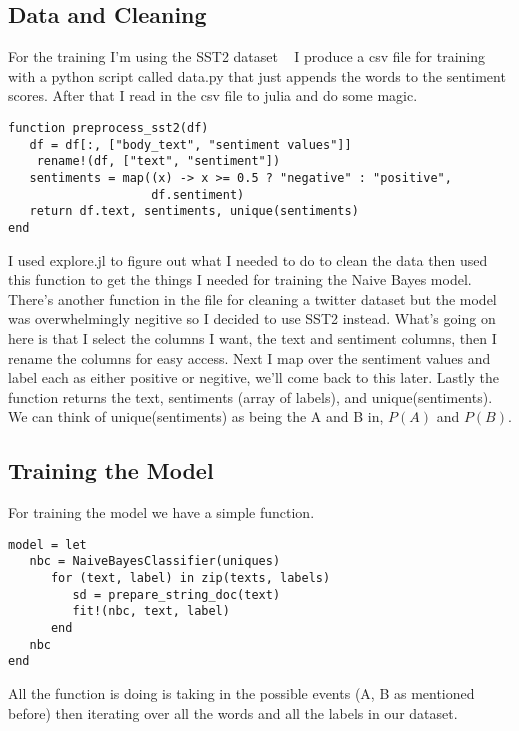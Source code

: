 \documentclass[12pt]{article}
\begin{document}
\subsection{Data and Cleaning}
For the training I'm using the SST2 dataset ~\cite{} %
I produce a csv file for training with a python script called data.py that just appends the words to the sentiment scores. After that I read in the csv file to julia and do some magic.
\begin{verbatim}
function preprocess_sst2(df)
   df = df[:, ["body_text", "sentiment values"]]
	rename!(df, ["text", "sentiment"])
   sentiments = map((x) -> x >= 0.5 ? "negative" : "positive",
                    df.sentiment)
   return df.text, sentiments, unique(sentiments)
end
\end{verbatim}
I used explore.jl to figure out what I needed to do to clean the data then used this function to get the things I needed for training the Naive Bayes model. There's another function in the file for cleaning a twitter dataset but the model was overwhelmingly negitive so I decided to use SST2 instead. What's going on here is that I select the columns I want, the text and sentiment columns, then I rename the columns for easy access. Next I map over the sentiment values and label each as either positive or negitive, we'll come back to this later. Lastly the function returns the text, sentiments (array of labels), and unique(sentiments). We can think of unique(sentiments) as being the A and B in, $P(A)$ and $P(B)$.

\subsection{Training the Model}
For training the model we have a simple function.
\begin{verbatim}
model = let
   nbc = NaiveBayesClassifier(uniques)
      for (text, label) in zip(texts, labels)
         sd = prepare_string_doc(text)
         fit!(nbc, text, label)
      end
   nbc
end
\end{verbatim}
All the function is doing is taking in the possible events (A, B as mentioned before) then iterating over all the words and all the labels in our dataset.
\end{document}
